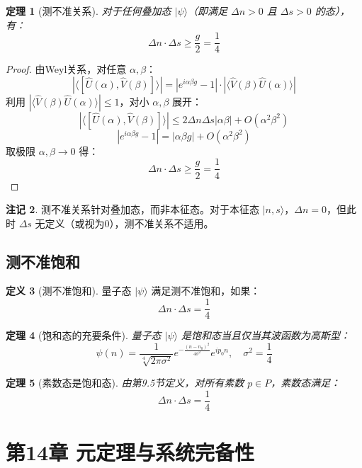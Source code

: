 \documentclass[12pt]{article}
\newtheorem{theorem}{定理}[section]
\theoremstyle{definition}
\newtheorem{definition}[theorem]{定义}
\newtheorem{remark}[theorem]{注记}
\begin{document}
\begin{theorem}[测不准关系]
对于任何叠加态 \(|\psi\rangle\)（即满足 \(\Delta n > 0\) 且 \(\Delta s > 0\) 的态），有：
\[
\Delta n \cdot \Delta s \geq \frac{g}{2} = \frac{1}{4}
\]
\end{theorem}

\begin{proof}
由Weyl关系，对任意 \(\alpha,\beta\)：
\[
|\langle [\hat{U}(\alpha), \hat{V}(\beta)] \rangle| = |e^{i\alpha\beta g} - 1| \cdot |\langle \hat{V}(\beta)\hat{U}(\alpha) \rangle|
\]
利用 \(|\langle \hat{V}(\beta)\hat{U}(\alpha) \rangle| \leq 1\)，对小 \(\alpha,\beta\) 展开：
\[
|\langle [\hat{U}(\alpha), \hat{V}(\beta)] \rangle| \leq 2\Delta n \Delta s |\alpha\beta| + O(\alpha^2\beta^2)
\]
\[
|e^{i\alpha\beta g} - 1| = |\alpha\beta g| + O(\alpha^2\beta^2)
\]
取极限 \(\alpha,\beta \to 0\) 得：
\[
\Delta n \cdot \Delta s \geq \frac{g}{2} = \frac{1}{4}
\]
\end{proof}

\begin{remark}
测不准关系针对叠加态，而非本征态。对于本征态 \(|n,s\rangle\)，\(\Delta n = 0\)，但此时 \(\Delta s\) 无定义（或视为0），测不准关系不适用。
\end{remark}

\subsection{测不准饱和}

\begin{definition}[测不准饱和]
量子态 \(|\psi\rangle\) 满足测不准饱和，如果：
\[
\Delta n \cdot \Delta s = \frac{1}{4}
\]
\end{definition}

\begin{theorem}[饱和态的充要条件]
量子态 \(|\psi\rangle\) 是饱和态当且仅当其波函数为高斯型：
\[
\psi(n) = \frac{1}{\sqrt[4]{2\pi\sigma^2}} e^{-\frac{(n-n_0)^2}{4\sigma^2}} e^{ip_0 n},\quad \sigma^2 = \frac{1}{4}
\]
\end{theorem}

\begin{theorem}[素数态是饱和态]
由第9.5节定义，对所有素数 \(p \in P\)，素数态满足：
\[
\Delta n \cdot \Delta s = \frac{1}{4}
\]
\end{theorem}

\section{第14章 元定理与系统完备性}
\end{document}
